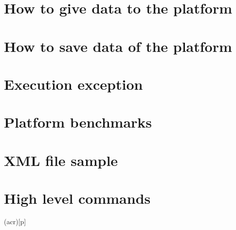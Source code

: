 \documentclass[a4paper,twoside,openright,makeidx,12pt]{book}
\begin{document}
\chapter{How to give data to the platform}
\label{Sec:UM-Loading}



\chapter{How to save data of the platform}
\label{Sec:UM-Saving}


\chapter{Execution exception}
\label{Sec:UM-Exception}


\chapter{Platform benchmarks}
\label{Sec:UM-Benchmarks}



%

\appendix
\chapter{XML file sample}
\label{Sec:UM-XMLFile}

\chapter{High level commands}
\label{Sec:UM-Command}




\printglosstex(acr)[p]


\listoffigures
\listoftables
\cleardoublepage


\end{document}
